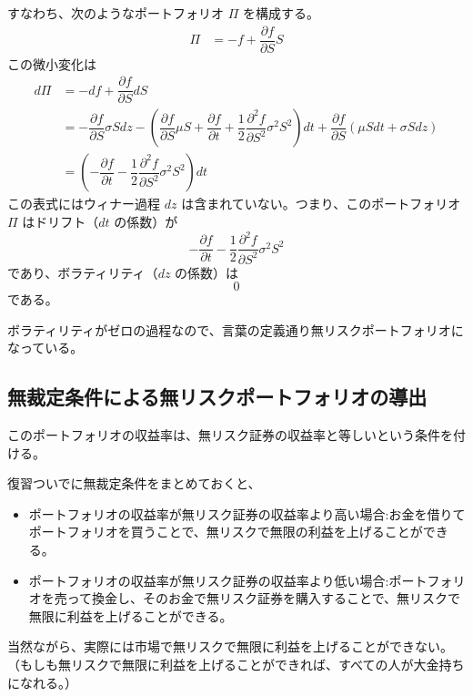 \documentclass[uplatex]{jsarticle}
\begin{document}
すなわち、次のようなポートフォリオ $\Pi$ を構成する。
\begin{align}
	\Pi & = - f + \dfrac{\partial f}{\partial S} S
\end{align}
この微小変化は
\begin{align}
	d \Pi & = - df + \dfrac{\partial f}{\partial S} dS                                                                                                                                                                                                                                \\
	      & = - \dfrac{\partial f}{\partial S} \sigma S dz - \left( \dfrac{\partial f}{\partial S} \mu S + \dfrac{\partial f}{\partial t} + \dfrac{1}{2} \dfrac{\partial^{2} f}{\partial S^{2}} \sigma^{2} S^{2} \right) dt + \dfrac{\partial f}{\partial S} (\mu S dt + \sigma S dz) \\
	      & = \left( - \dfrac{\partial f}{\partial t} - \dfrac{1}{2} \dfrac{\partial^{2} f}{\partial S^{2}} \sigma^{2} S^{2} \right) dt
\end{align}
この表式にはウィナー過程 $dz$ は含まれていない。つまり、このポートフォリオ $\Pi$ はドリフト（$dt$ の係数）が
$$
	- \dfrac{\partial f}{\partial t} - \dfrac{1}{2} \dfrac{\partial^{2} f}{\partial S^{2}} \sigma^{2} S^{2}
$$
であり、ボラティリティ（$dz$ の係数）は
$$
	0
$$
である。

ボラティリティがゼロの過程なので、言葉の定義通り無リスクポートフォリオになっている。

\subsection{無裁定条件による無リスクポートフォリオの導出}

このポートフォリオの収益率は、無リスク証券の収益率と等しいという条件を付ける。

復習ついでに無裁定条件をまとめておくと、
\begin{itemize}
	\item ポートフォリオの収益率が無リスク証券の収益率より高い場合:お金を借りてポートフォリオを買うことで、無リスクで無限の利益を上げることができる。
	\item ポートフォリオの収益率が無リスク証券の収益率より低い場合:ポートフォリオを売って換金し、そのお金で無リスク証券を購入することで、無リスクで無限に利益を上げることができる。
\end{itemize}
当然ながら、実際には市場で無リスクで無限に利益を上げることができない。（もしも無リスクで無限に利益を上げることができれば、すべての人が大金持ちになれる。）
\end{document}
